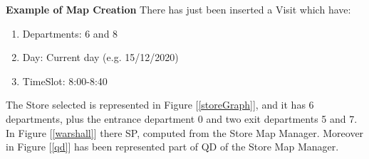 \documentclass[a4paper, 12pt, oneside, table]{article}
\begin{document}
\vspace{0.4em}
\textbf{Example of Map Creation} \newline
\vspace{0.4em}
There has just been inserted a Visit which have:
\begin{enumerate}[label=-]
    \item Departments: 6 and 8
    \item Day: Current day (e.g. 15/12/2020)
    \item TimeSlot: 8:00-8:40
\end{enumerate}
The Store selected is represented in Figure [\ref{storeGraph}], and it has 6 departments, plus the entrance department 0 and two exit departments 5 and 7. In Figure [\ref{warshall}] there SP, computed from the Store Map Manager. Moreover in Figure [\ref{qd}] has been represented part of QD of the Store Map Manager.
\end{document}
